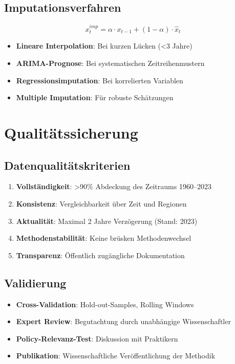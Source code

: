 \subsection{Imputationsverfahren}

\[
x_{t}^{imp} = \alpha \cdot x_{t-1} + (1-\alpha) \cdot \hat{x}_{t}
\]

\begin{itemize}
    \item \textbf{Lineare Interpolation}: Bei kurzen Lücken (<3 Jahre)
    \item \textbf{ARIMA-Prognose}: Bei systematischen Zeitreihenmustern
    \item \textbf{Regressionsimputation}: Bei korrelierten Variablen
    \item \textbf{Multiple Imputation}: Für robuste Schätzungen
\end{itemize}

\section{Qualitätssicherung}

\subsection{Datenqualitätskriterien}

\begin{enumerate}
    \item \textbf{Vollständigkeit}: >90\% Abdeckung des Zeitraums 1960–2023
    \item \textbf{Konsistenz}: Vergleichbarkeit über Zeit und Regionen
    \item \textbf{Aktualität}: Maximal 2 Jahre Verzögerung (Stand: 2023)
    \item \textbf{Methodenstabilität}: Keine brüsken Methodenwechsel
    \item \textbf{Transparenz}: Öffentlich zugängliche Dokumentation
\end{enumerate}

\subsection{Validierung}

\begin{itemize}
    \item \textbf{Cross-Validation}: Hold-out-Samples, Rolling Windows
    \item \textbf{Expert Review}: Begutachtung durch unabhängige Wissenschaftler
    \item \textbf{Policy-Relevanz-Test}: Diskussion mit Praktikern
    \item \textbf{Publikation}: Wissenschaftliche Veröffentlichung der Methodik
\end{itemize}

